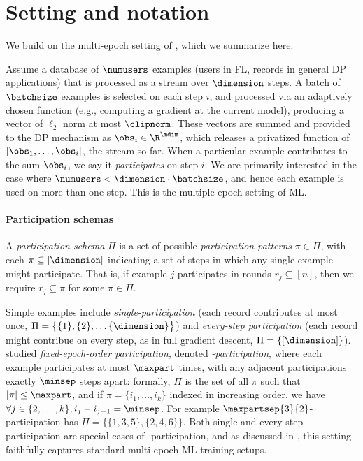 \section{Setting and notation}
We build on the multi-epoch setting of \citet{choquette22multiepoch}, which we summarize here.  

Assume a database of $\numusers$ examples (users in FL, records in general DP applications) that is processed as a stream over $\dimension$ steps. A batch of $\batchsize$ examples is selected on each step $i$, and processed via an adaptively chosen function (e.g., computing a gradient at the current model), producing a vector of $\ell_2$ norm at most $\clipnorm$. These vectors are summed and provided to the DP mechanism as $\obs_i \in \R^\mdim$, which releases a privatized function of $[\obs_1, \dots, \obs_i]$, the stream so far. When a particular example contributes to the sum $\obs_i$, we say it \emph{participates} on step $i$. We are primarily interested in the case where $\numusers < \dimension \cdot \batchsize$, and hence each example is used on more than one step. This is the multiple epoch setting of ML.


\paragraph{Participation schemas}
A \emph{participation schema} $\Pi$ is a set of possible \emph{participation patterns} $\pi \in \Pi$, with each $\pi \subseteq [\dimension]$ indicating a set of steps in which any single example might participate. That is, if example $j$ participates in rounds $r_j \subseteq [n]$, then we require $r_j \subseteq \pi$ for some $\pi \in \Pi$.

Simple examples include \emph{single-participation} (each record contributes at most once, $\Pi = \big\{ \{1\}, \{2\}, \dots \{\dimension\}\big\}$) and \emph{every-step participation} (each record might contribue on every step, as in full gradient descent, $\Pi = \{ [\dimension]\}$).  \citet{choquette22multiepoch} studied \emph{fixed-epoch-order participation}, denoted \emph{\multiepoch-participation}, where each example participates at most $\maxpart$ times, with any adjacent participations exactly $\minsep$ steps apart: formally, $\Pi$ is the set of all $\pi$ such that $|\pi| \le \maxpart$, and if $\pi = \{i_1, \dots, i_k\}$ indexed in increasing order, we have $\forall j \in \{2, \dots, k\}, i_j - i_{j-1} = \minsep$. For example $\maxpartsep{3}{2}$-participation has $\Pi = \{\{1, 3, 5\}, \{2, 4, 6\}\}$. Both single and every-step participation are special cases of \multiepoch-participation, and as discussed in \citet{choquette22multiepoch}, this setting faithfully captures standard multi-epoch ML training setups.

